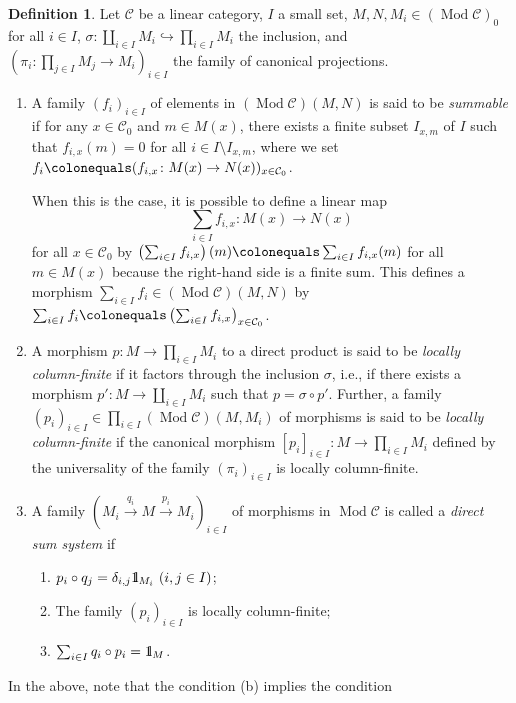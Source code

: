 \documentclass{surv-l}
\numberwithin{equation}{chapter}
\numberwithin{figure}{chapter}
\theoremstyle{plain}
\theoremstyle{definition}
\newtheorem{dfn}[thm]{Definition}
\theoremstyle{remark}
\newcommand{\id}{1\kern-.25em{\text{{\rm l}}}}
\DeclareMathOperator{\Mod}{Mod}
\begin{document}
\begin{dfn}\label{dfn:sumable-dss}
Let ${\mathcal{C}}$ be a linear category, $I$ a small set,
$M, N, M_i \in (\Mod{\mathcal{C}})_0$ for all $i\in I$,
$\sigma \colon \coprod_{i\in I}M_i \hookrightarrow \prod_{i\in I}M_i$
the inclusion, and
$(\pi_i\colon \prod_{j\in I}M_j \to M_i)_{i\in I}$ the family of canonical projections.
\begin{enumerate}
\item
A family $(f_i)_{i \in I}$ of elements in $(\Mod{\mathcal{C}})(M, N)$
is said to be \emph{summable} if
for any $x \in {\mathcal{C}}_0$ and $m \in M(x)$,
there exists a finite subset $I_{x,m}$ of $I$
such that $f_{i,x}(m) = 0$ for all $i \in I \setminus I_{x,m}$,
where we set $f_i\colonequals  (f_{i,x} \colon M(x) \to N(x))_{x\in {\mathcal{C}}_0}$.

When this is the case,
it is possible to define a linear map
\[
\sum_{i\in I} f_{i,x} \colon M(x) \to N(x)
\]
for all $x \in {\mathcal{C}}_0$ by
$\left(\sum_{i\in I} f_{i,x}\right)(m)\colonequals  \sum_{i\in I} f_{i,x}(m)$
for all $m \in M(x)$
because the right-hand side is a finite sum.
This defines a morphism
$\sum_{i\in I} f_i \in (\Mod{\mathcal{C}})(M, N)$ by
$\sum_{i\in I} f_i\colonequals  \left(\sum_{i\in I} f_{i,x}\right)_{x \in {\mathcal{C}}_0}$.

\item
A morphism $p \colon M \to \prod_{i\in I}M_i$ to a direct product
is said to be \emph{locally column-finite} if it factors through the inclusion $\sigma$,
i.e., if there exists a morphism
$p' \colon M \to \coprod_{i\in I}M_i$ such that
$p = \sigma \circ p'$.
Further, a family $(p_i)_{i \in I} \in \prod_{i\in I}(\Mod{\mathcal{C}})(M, M_i)$ of morphisms
is said to be \emph{locally column-finite} if
the canonical morphism $[p_i]_{i\in I} \colon M \to \prod_{i\in I}M_i$
defined by the universality of the family $(\pi_i)_{i\in I}$ is locally column-finite.

\item
A family $(M_i \xrightarrow{q_i} M \xrightarrow{p_i} M_i)_{i \in I}$ of morphisms in $\Mod{\mathcal{C}}$
is called a \emph{direct sum system} if
\begin{enumerate}
\item
$p_i \circ q_j = \delta_{i,j}\id_{M_i}\ (i, j \in I)$;
\item
The family $(p_i)_{i\in I}$ is locally column-finite;
\item
$\sum_{i\in I} q_i \circ p_i = \id_M$.
\end{enumerate}
\end{enumerate}
In the above, note that the condition (b) implies the condition


\end{dfn}
\end{document}
